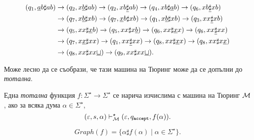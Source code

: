 \begin{example}
  \begin{align*}
    (q_1, \underline{a}b\sharp ab) & \to (q_2, x\underline{b}\sharp ab) \to (q_2,xb\underline{\sharp}ab) \to (q_4, xb\sharp\underline{a}b) \to (q_6, xb\underline{\sharp}xb)\\
    & \to (q_7, x\underline{b}\sharp xb) \to (q_7, \underline{x}b\sharp xb) \to (q_1, x\underline{b}\sharp xb) \to (q_3, xx\underline{\sharp}xb)\\
    & \to (q_5, xx\sharp\underline{x}b) \to (q_5, xx\sharp x\underline{b}) \to (q_6, xx\sharp\underline{x}x) \to (q_6, xx\underline{\sharp} xx)\\
    & \to (q_7, x\underline{x}\sharp xx) \to (q_1, xx\underline{\sharp} xx) \to (q_8, xx\sharp\underline{x}x) \to (q_8, xx\sharp x\underline{x})\\
    & \to (q_8, xx\sharp xx\underline{\sqcup}) \to (q_9,xx\sharp xx\underline{\sqcup}).
  \end{align*}

  Може лесно да се съобрази, че тази машина на Тюринг може да се допълни до {\em тотална}.
  
\end{example}


Една {\em тотална} функция $f:\Sigma^\star \to \Sigma^\star$ се нарича изчислима с машина на Тюринг $\mathcal{M}$, ако 
за всяка дума $\alpha \in \Sigma^\star$,
\[(\varepsilon, s, \alpha) \vdash^\star_{\mathcal{M}} (\varepsilon, q_{\texttt{accept}}, f(\alpha)).\]



\[Graph(f) = \{\alpha\sharp f(\alpha) \mid \alpha \in \Sigma^\star\}.\]

